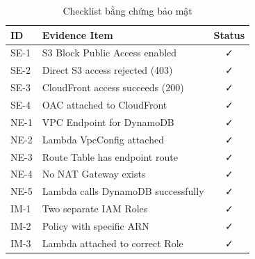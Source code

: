 \begin{table}[H]
\centering
\begin{tabular}{|l|l|c|}
\hline
\textbf{ID} & \textbf{Evidence Item} & \textbf{Status} \\
\hline
SE-1 & S3 Block Public Access enabled & ✓ \\
SE-2 & Direct S3 access rejected (403) & ✓ \\
SE-3 & CloudFront access succeeds (200) & ✓ \\
SE-4 & OAC attached to CloudFront & ✓ \\
NE-1 & VPC Endpoint for DynamoDB & ✓ \\
NE-2 & Lambda VpcConfig attached & ✓ \\
NE-3 & Route Table has endpoint route & ✓ \\
NE-4 & No NAT Gateway exists & ✓ \\
NE-5 & Lambda calls DynamoDB successfully & ✓ \\
IM-1 & Two separate IAM Roles & ✓ \\
IM-2 & Policy with specific ARN & ✓ \\
IM-3 & Lambda attached to correct Role & ✓ \\
\hline
\end{tabular}
\caption{Checklist bằng chứng bảo mật}
\label{tab:security_checklist}
\end{table}
